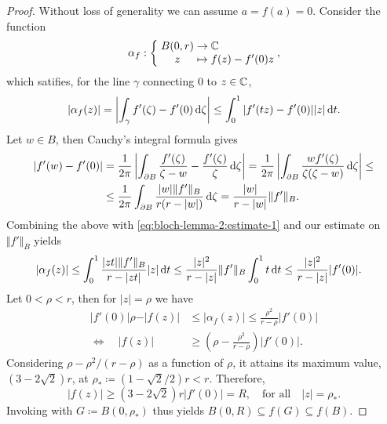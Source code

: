\begin{proof}
    Without loss of generality we can assume $a = f(a) = 0$. Consider the function
    $$ \mapping{\alpha_f}{B(0, r) & \to & \C}{z & \mapsto & f(z) - f'(0) z}, $$
    which satifies, for the line $\gamma$ connecting $0$ to $z \in \mathbb{C}$,
    \begin{equation} \label{eq:bloch-lemma-2:estimate-1}
        \vert \alpha_f(z) \vert = \left\vert \int_\gamma f'(\zeta) - f'(0) \mathop{}\!\mathrm{d} \zeta \right\vert \leq \int_0^1 \vert f'(t z) - f'(0) \vert \vert z \vert \mathop{}\!\mathrm{d} t.
    \end{equation}
    Let $w \in B$, then Cauchy's integral formula gives
    \begin{align*}
        \vert f'(w) - f'(0) \vert &= \frac{1}{2\pi} \left\vert \int_{\partial B} \frac{f'(\zeta)}{\zeta - w} - \frac{f'(\zeta)}{\zeta} \mathop{}\!\mathrm{d} \zeta \right\vert = \frac{1}{2\pi} \left\vert \int_{\partial B} \frac{w f'(\zeta)}{\zeta (\zeta - w)} \mathop{}\!\mathrm{d} \zeta \right\vert \leq \\
        &\leq \frac{1}{2\pi} \int_{\partial B} \frac{\vert w \vert \Vert f' \Vert_B}{r(r - \vert w \vert)} \mathop{}\!\mathrm{d} \zeta = \frac{\vert w \vert}{r - \vert w \vert} \Vert f' \Vert_B.
    \end{align*}
    Combining the above with \cref{eq:bloch-lemma-2:estimate-1} and our estimate on $\Vert f' \Vert_B$ yields
    \begin{align*}
        \vert \alpha_f(z) \vert &\leq \int_0^1 \frac{\vert z t \vert \Vert f' \Vert_B}{r - \vert z t \vert} \vert z \vert \mathop{}\!\mathrm{d} t \leq \frac{\vert z \vert^2}{r - \vert z \vert} \Vert f' \Vert_B \int_0^1 t \mathop{}\!\mathrm{d} t \leq \frac{\vert z \vert^2}{r - \vert z \vert} \vert f'(0) \vert.
    \end{align*}
    Let $0 < \rho < r$, then for $\vert z \vert = \rho$ we have
    \begin{align*}
        \vert f'(0) \vert \rho - \vert f(z) \vert &\leq \vert \alpha_f(z) \vert \leq \frac{\rho^2}{r - \rho} \vert f'(0) \vert \\
        \Longleftrightarrow \quad \vert f(z) \vert &\geq \left( \rho - \frac{\rho^2}{r - \rho} \right) \vert f'(0) \vert.
    \end{align*}
    Considering $\rho - \rho^2 / (r - \rho)$ as a function of $\rho$, it attains its maximum value, $(3 - 2 \sqrt{2}) r$, at $\rho_* \coloneqq (1 - \sqrt{2} / 2)r < r$. Therefore,
    \begin{equation*}
        \vert f(z) \vert \geq (3 - 2 \sqrt{2}) r \vert f'(0) \vert = R, \quad \textrm{for all} \quad \vert z \vert = \rho_*.
    \end{equation*}
    Invoking  with $G \coloneqq B(0, \rho_*)$ thus yields $B(0, R) \subseteq f(G) \subseteq f(B)$.
\end{proof}


